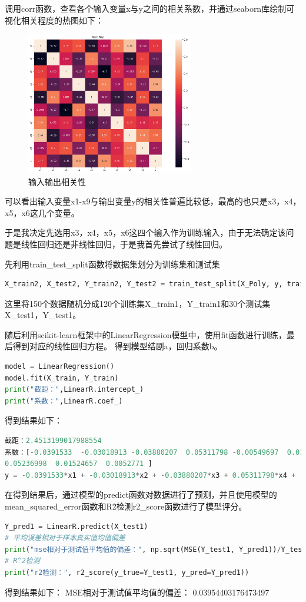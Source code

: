 \documentclass{source/Experiment}
\begin{document}
调用corr函数，查看各个输入变量x与y之间的相关系数，并通过seaborn库绘制可视化相关程度的热图如下：
\begin{figure}[H]
    \centering
    \includegraphics[width = 0.65\textwidth]{HeatMap}
    \caption{输入输出相关性}
\end{figure}
可以看出输入变量x1-x9与输出变量y的相关性普遍比较低，最高的也只是x3，x4，x5，x6这几个变量。

于是我决定先选用x3，x4，x5，x6这四个输入作为训练输入，由于无法确定该问题是线性回归还是非线性回归，于是我首先尝试了线性回归。

先利用train\_test\_split函数将数据集划分为训练集和测试集
\begin{lstlisting}[language=Python]
X_train2, X_test2, Y_train2, Y_test2 = train_test_split(X_Poly, y, train_size=0.80, random_state=1)
            \end{lstlisting}

这里将150个数据随机分成120个训练集X\_train1，Y\_train1和30个测试集X\_test1，Y\_test1。

随后利用scikit-learn框架中的LinearRegression模型中，使用fit函数进行训练，最后得到对应的线性回归方程。
得到模型结剧a，回归系数b。
\begin{lstlisting}[language=Python]
model = LinearRegression()
model.fit(X_train, Y_train)
print("截距：",LinearR.intercept_)
print("系数：",LinearR.coef_)
            \end{lstlisting}
得到结果如下：
\begin{lstlisting}[language=Python]
截距：2.4513199017988554
系数：[-0.0391533  -0.03018913 -0.03880207  0.05311798 -0.00549697  0.01419835
0.05236998  0.01524657  0.0052771 ]
y = -0.0391533*x1 + -0.03018913*x2 + -0.03880207*x3 + 0.05311798*x4 + -0.00549697*x5 + 0.01419835*x6 + 0.05236998*x7 + 0.01524657*x8 + 0.0052771*x9
            \end{lstlisting}
在得到结果后，通过模型的predict函数对数据进行了预测，并且使用模型的mean\_squared\_error函数和R\^2检测r2\_score函数进行了模型评分。
\begin{lstlisting}[language=Python]
Y_pred1 = LinearR.predict(X_test1)
# 平均误差相对于样本真实值均值偏差
print("mse相对于测试值平均值的偏差：", np.sqrt(MSE(Y_test1, Y_pred1))/Y_test1.mean())
# R^2检测
print("r2检测：", r2_score(y_true=Y_test1, y_pred=Y_pred1))
            \end{lstlisting}
得到结果如下：
MSE相对于测试值平均值的偏差： 0.03954403176473497
\end{document}
